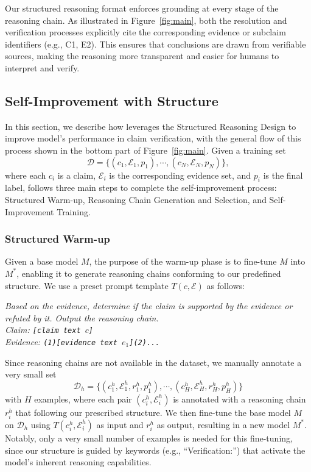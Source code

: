 Our structured reasoning format enforces grounding at every stage of the reasoning chain. As illustrated in Figure~\ref{fig:main}, both the resolution and verification processes explicitly cite the corresponding evidence or subclaim identifiers (e.g., C1, E2). This ensures that conclusions are drawn from verifiable sources, making the reasoning more transparent and easier for humans to interpret and verify.


\subsection{Self-Improvement with Structure}
In this section, we describe how \themodel leverages the Structured Reasoning Design to improve model's performance in claim verification,  with the general flow of this process shown in the bottom part of Figure~\ref{fig:main}. Given a training set \begin{equation*}\mathcal{D} = \{(c_1, \mathcal{E}_1, p_1), \cdots, (c_N, \mathcal{E}_N, p_N)\},\end{equation*} where each $c_i$ is a claim, $\mathcal{E}_i$ is the corresponding evidence set, and $p_i$ is the final label, \themodel follows three main steps to complete the self-improvement process: Structured Warm-up, Reasoning Chain Generation and Selection, and Self-Improvement Training.
\subsubsection{Structured Warm-up}\label{sec:ourprompt}
Given a base model $M$, the purpose of the warm-up phase is to fine-tune $M$ into $M^*$, enabling it to generate reasoning chains conforming to our predefined structure. We use a preset prompt template $T(c,\mathcal{E})$ as follows:

\begin{mybox}
\textit{Based on the evidence, determine if the claim is supported by the evidence or refuted by it. Output the reasoning chain.\\
Claim: \texttt{[claim text $c$]}\\
Evidence: \texttt{(1)[evidence text $e_1$](2)...}}
\end{mybox}
Since reasoning chains are not available in the dataset, we manually annotate a very small set \begin{equation*} \mathcal{D}_h=\{(c_1^h,\mathcal{E}^h_1,r^h_1,p^h_1),\cdots,(c_H^h,\mathcal{E}^h_H,r^h_H,p^h_H)\}\end{equation*} with $H$ examples, where each pair $(c^h_i,\mathcal{E}^h_i)$ is annotated with a reasoning chain $r_i^h$ that following our prescribed structure. We then fine-tune the base model $M$ on $\mathcal{D}_h$ using $T(c^h_i,\mathcal{E}_i^h)$ as input and $r_i^h$ as output, resulting in a new model $M^*$. Notably, only a very small number of examples is needed for this fine-tuning, since our structure is guided by keywords (e.g., ``Verification:'') that activate the model’s inherent reasoning capabilities.
